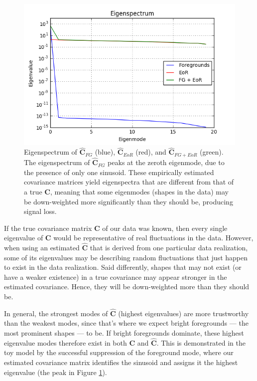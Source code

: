 \documentclass[preprint2,numberedappendix,tighten]{aastex6}  %
\begin{document}
\begin{figure}
	\centering
	\includegraphics[trim={0.3cm 0.2cm 0.3cm 0.3cm},clip,width=\columnwidth]{plots/toy_sigloss2.png}
	\caption{Eigenspectrum of $\hat{\textbf{C}}_{FG}$ (blue), $\hat{\textbf{C}}_{EoR}$ (red), and $\hat{\textbf{C}}_{FG+EoR}$ (green). The eigenspectrum of $\hat{\textbf{C}}_{FG}$ peaks at the zeroth eigenmode, due to the presence of only one sinusoid. These empirically estimated covariance matrices yield eigenspectra that are different from that of a true $\textbf{C}$, meaning that some eigenmodes (shapes in the data) may be down-weighted more significantly than they should be, producing signal loss.}
	\label{fig:toy_sigloss2}
\end{figure}

If the true covariance matrix $\textbf{C}$ of our data was known, then every single eigenvalue of $\textbf{C}$ would be representative of real fluctuations in the data. However, when using an estimated $\hat{\textbf{C}}$ that is derived from one particular data realization, some of its eigenvalues may be describing random fluctuations that just happen to exist in the data realization. Said differently, shapes that may not exist (or have a weaker existence) in a true covariance may appear stronger in the estimated covariance. Hence, they will be down-weighted more than they should be.

In general, the strongest modes of $\hat{\textbf{C}}$ (highest eigenvalues) are more trustworthy than the weakest modes, since that's where we expect bright foregrounds --- the most prominent shapes --- to be. If bright foregrounds dominate, these highest eigenvalue modes therefore exist in both $\textbf{C}$ and $\hat{\textbf{C}}$. This is demonstrated in the toy model by the successful suppression of the foreground mode, where our estimated covariance matrix identifies the sinusoid and assigns it the highest eigenvalue (the peak in Figure \ref{fig:toy_sigloss2}). 
\end{document}
